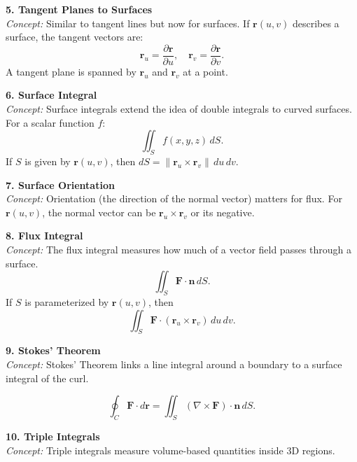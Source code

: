 \documentclass[9pt]{article}
\begin{document}
\begin{multicols}{2}
\begin{tcolorbox}[title=, colframe=brightblue]
\textbf{5. Tangent Planes to Surfaces}\\
\textit{Concept:} Similar to tangent lines but now for surfaces. If $\mathbf{r}(u,v)$ describes a surface, the tangent vectors are:
\[
\mathbf{r}_u=\frac{\partial\mathbf{r}}{\partial u}, \quad \mathbf{r}_v=\frac{\partial\mathbf{r}}{\partial v}.
\]
A tangent plane is spanned by $\mathbf{r}_u$ and $\mathbf{r}_v$ at a point.
\end{tcolorbox}

\begin{tcolorbox}[title=, colframe=brightgreen]
\textbf{6. Surface Integral}\\
\textit{Concept:} Surface integrals extend the idea of double integrals to curved surfaces. For a scalar function $f$:
\[
\iint_S f(x,y,z)\,dS.
\]
If $S$ is given by $\mathbf{r}(u,v)$, then $dS=\|\mathbf{r}_u\times\mathbf{r}_v\|\,du\,dv$.
\end{tcolorbox}

\begin{tcolorbox}[title=, colframe=brightpink]
\textbf{7. Surface Orientation}\\
\textit{Concept:} Orientation (the direction of the normal vector) matters for flux. For $\mathbf{r}(u,v)$, the normal vector can be $\mathbf{r}_u\times\mathbf{r}_v$ or its negative.
\end{tcolorbox}

\begin{tcolorbox}[title=, colframe=brightyellow]
\textbf{8. Flux Integral}\\
\textit{Concept:} The flux integral measures how much of a vector field passes through a surface. 
\[
\iint_S \mathbf{F}\cdot\mathbf{n}\,dS.
\]
If $S$ is parameterized by $\mathbf{r}(u,v)$, then
\[
\iint_S \mathbf{F}\cdot(\mathbf{r}_u\times\mathbf{r}_v)\,du\,dv.
\]
\end{tcolorbox}

\begin{tcolorbox}[title=, colframe=brightblue]
\textbf{9. Stokes' Theorem}\\
\textit{Concept:} Stokes' Theorem links a line integral around a boundary to a surface integral of the curl.

\[
\oint_C \mathbf{F}\cdot d\mathbf{r}=\iint_S (\nabla \times \mathbf{F})\cdot \mathbf{n}\,dS.
\]
\end{tcolorbox}

\begin{tcolorbox}[title=, colframe=brightgreen]
\textbf{10. Triple Integrals}\\
\textit{Concept:} Triple integrals measure volume-based quantities inside 3D regions.


\end{tcolorbox}
\end{multicols}
\end{document}
